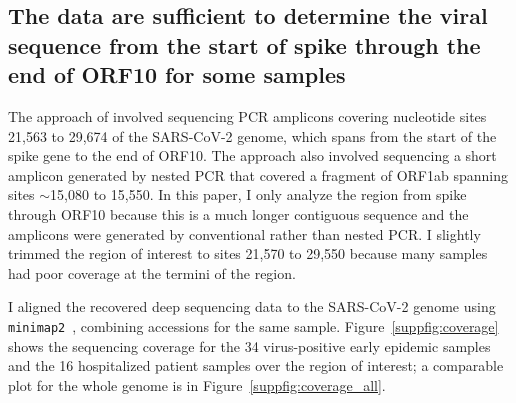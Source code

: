 \documentclass[9pt,twocolumn,twoside]{gsajnl_modified}
\begin{document}
\subsection{The data are sufficient to determine the viral sequence from the start of spike through the end of ORF10 for some samples}
The approach of \citet{wang2020medRxiv} involved sequencing PCR amplicons covering nucleotide sites 21,563 to 29,674 of the SARS-CoV-2 genome, which spans from the start of the spike gene to the end of ORF10.
The approach also involved sequencing a short amplicon generated by nested PCR that covered a fragment of ORF1ab spanning sites $\sim$15,080 to 15,550.
In this paper, I only analyze the region from spike through ORF10 because this is a much longer contiguous sequence and the amplicons were generated by conventional rather than nested PCR.
I slightly trimmed the region of interest to sites 21,570 to 29,550 because many samples had poor coverage at the termini of the region.

I aligned the recovered deep sequencing data to the SARS-CoV-2 genome using \texttt{minimap2}~\citep{li2018minimap2}, combining accessions for the same sample.
Figure~\ref{suppfig:coverage} shows the sequencing coverage for the 34 virus-positive early epidemic samples and the 16 hospitalized patient samples over the region of interest; a comparable plot for the whole genome is in Figure~\ref{suppfig:coverage_all}.
\end{document}
